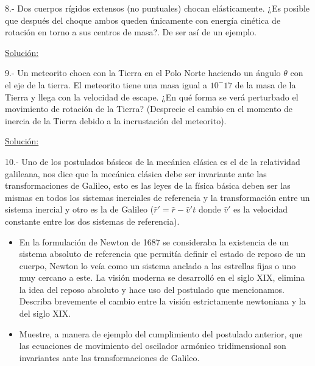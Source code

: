 \documentclass[a4paper,10pt]{article}
\begin{document}
\vspace{.3cm}

8.- Dos cuerpos rígidos extensos (no puntuales) chocan elásticamente. ¿Es posible que 
después del choque ambos queden únicamente con energía cinética de rotación en torno 
a sus centros de masa?. De ser así de un ejemplo.
\vspace{.3cm}

\underline{Solución:}

\vspace{.3cm}

9.- Un meteorito choca con la Tierra en el Polo Norte haciendo un ángulo $\theta$ con
el eje de la tierra. El meteorito tiene una masa igual a $10^-17$ de la masa de la 
Tierra y llega con la velocidad de escape. ¿En qué forma se verá perturbado el movimiento
de rotación de la Tierra? (Desprecie el cambio en el momento de inercia de la Tierra
debido a la incrustación del meteorito).
\vspace{.3cm}

\underline{Solución:}



\vspace{.3cm}

10.- Uno de los postulados básicos de la mecánica clásica es el de la relatividad galileana,
nos dice que la mecánica clásica debe ser invariante ante las transformaciones de Galileo, 
esto es las leyes de la física básica deben ser las mismas en todos los sistemas inerciales
de referencia y la transformación entre un sistema inercial y otro es la de Galileo 
($\hat{r}' = \hat{r} - \hat{v}'t$ donde $\hat{v}'$ es la velocidad constante entre los dos 
sistemas de referencia).

\begin{itemize}
 \item En la formulación de Newton de 1687 se consideraba la existencia de un sistema 
 absoluto de referencia que permitía definir el estado de reposo de un cuerpo, Newton lo
 veía como un sistema anclado a las estrellas fijas o uno muy cercano a este. La visión 
 moderna se desarrolló en el siglo XIX, elimina la idea del reposo absoluto y hace 
 uso del postulado que mencionamos. Describa brevemente el cambio entre la visión 
 estrictamente newtoniana y la del siglo XIX.
 \item Muestre, a manera de ejemplo del cumplimiento del postulado anterior, que las 
 ecuaciones de movimiento del oscilador armónico tridimensional son invariantes ante
 las transformaciones de Galileo.
\end{itemize}
\end{document}
